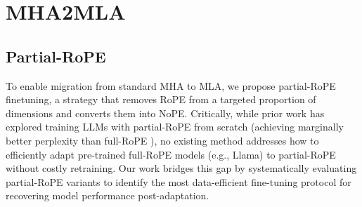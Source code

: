 \section{MHA2MLA}


\subsection{Partial-RoPE}
\label{ssec:partial_rope}


To enable migration from standard MHA to MLA, we propose partial-RoPE finetuning, a strategy that removes RoPE from a targeted proportion of dimensions and converts them into NoPE. 
Critically, while prior work has explored training LLMs with partial-RoPE from scratch (achieving marginally better perplexity than full-RoPE \cite{gpt-neo,corr/abs-2410-06205}), no existing method addresses how to efficiently adapt pre-trained full-RoPE models (e.g., Llama) to partial-RoPE without costly retraining. 
Our work bridges this gap by systematically evaluating partial-RoPE variants to identify the most data-efficient fine-tuning protocol for recovering model performance post-adaptation.






